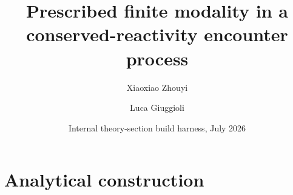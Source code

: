 \documentclass[aps,physrev,reprint,amsmath,amssymb]{revtex4-2}
\begin{document}
\title{Prescribed finite modality in a conserved-reactivity encounter process}
\author{Xiaoxiao Zhouyi}
\author{Luca Giuggioli}
\date{Internal theory-section build harness, July 2026}
\maketitle

\section{Analytical construction}

\end{document}
